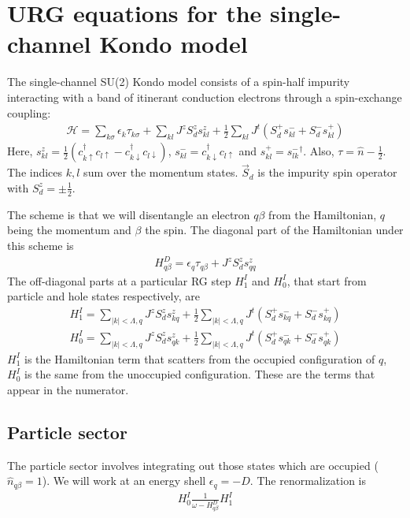 \documentclass[12pt]{revtex4-2}
\begin{document}
\clearpage
\appendix
\section{URG equations for the single-channel Kondo model}
The single-channel SU(2) Kondo model consists of a spin-half impurity interacting with a band of itinerant conduction electrons through a spin-exchange coupling:
\begin{align}
\label{1KondoURG}
	\mathcal{H} = \sum_{k\sigma}\epsilon_{k}\tau_{k\sigma} + \sum_{kl} J^z S_d^z s^z_{kl} + \frac{1}{2}\sum_{kl} J^t \left(S_d^+ s^-_{kl}  + S_d^- s^+_{kl}\right)
\end{align}
Here, \(s^z_{kl} = \frac{1}{2}\left(c^\dagger_{k\uparrow}c_{l \uparrow} - c^\dagger_{k\downarrow}c_{l \downarrow}\right)\), \(s^-_{kl} = c^\dagger_{k \downarrow}c_{l \uparrow}\) and \(s^+_{kl} = {s^-_{lk}}^\dagger\). Also, \(\tau = \hat n - \frac{1}{2}\). The indices \(k,l\) sum over the momentum states. \(\vec S_d\) is the impurity spin operator with \(S_d^z = \pm \frac{1}{2}\).

The scheme is that we will disentangle an electron \(q\beta\) from the Hamiltonian, \(q\) being the momentum and \(\beta\) the spin. The diagonal part of the Hamiltonian under this scheme is
\begin{align}
\label{kondodiag}
H^D_{q\beta} = \epsilon_q \tau_{q\beta} + J^z S_d^z s_{qq}^z
\end{align}
The off-diagonal parts at a particular RG step \(H^I_1\) and \(H^I_0\), that start from particle and hole states respectively, are
\begin{align}
	H^I_1 = \sum_{|k|<\Lambda,q} J^z S_d^z s^z_{kq} + \frac{1}{2}\sum_{|k|<\Lambda,q} J^t \left(S_d^+ s^-_{kq} + S_d^- s^+_{kq}\right)\\
	H^I_0 = \sum_{|k|<\Lambda,q} J^z S_d^z s^z_{qk} + \frac{1}{2}\sum_{|k|<\Lambda,q} J^t \left(S_d^+ s^-_{qk}  + S_d^- s^+_{qk}\right)
\end{align}
\(H^I_1\) is the Hamiltonian term that scatters from the occupied configuration of \(q\), \(H^I_0\) is the same from the unoccupied configuration.
These are the terms that appear in the numerator.
\subsection{Particle sector}
The particle sector involves integrating out those states which are occupied (\(\hat n_{q\beta}=1\)). We will work at an energy  shell \(\epsilon_q = -D\). The renormalization is
\begin{align}
	H^I_0 \frac{1}{\omega - H^D_{q\beta}} H^I_1
\end{align}
\end{document}
